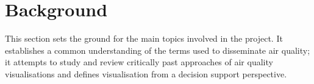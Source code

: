 \chapter{Background}
This section sets the ground for the main topics involved in the project. It establishes a common understanding of the terms used to disseminate air quality; it attempts to study and review critically past approaches of air quality visualisations and defines visualisation from a decision support perspective.






